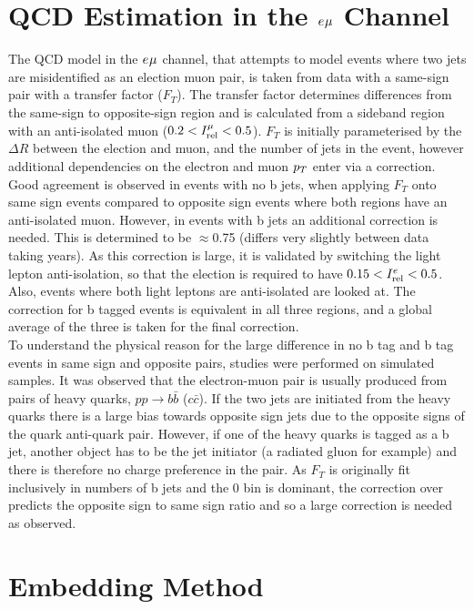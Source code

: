 \section{QCD Estimation in the $e_{}\mu_{}$ Channel}
\label{sec:qcd}

The QCD model in the $e_{}\mu_{}$ channel, that attempts to model events where two jets are misidentified as an election muon pair, is taken from data with a same-sign pair with a transfer factor ($F_{T}$).
The transfer factor determines differences from the same-sign to opposite-sign region and is calculated from a sideband region with an anti-isolated muon ($0.2 < I_{\text{rel}}^{\mu} < 0.5$).
$F_{T}$ is initially parameterised by the $\Delta R$ between the election and muon, and the number of jets in the event, however additional dependencies on the electron and muon $p_{T}$ enter via a correction. \\
Good agreement is observed in events with no b jets, when applying $F_{T}$ onto same sign events compared to opposite sign events where both regions have an anti-isolated muon. 
However, in events with b jets an additional correction is needed.
This is determined to be $\approx$0.75 (differs very slightly between data taking years).
As this correction is large, it is validated by switching the light lepton anti-isolation, so that the election is required to have $0.15 < I_{\text{rel}}^{e} < 0.5$.
Also, events where both light leptons are anti-isolated are looked at.
The correction for b tagged events is equivalent in all three regions, and a global average of the three is taken for the final correction. \\

To understand the physical reason for the large difference in no b tag and b tag events in same sign and opposite pairs, studies were performed on simulated samples.
It was observed that the electron-muon pair is usually produced from pairs of heavy quarks, $pp\rightarrow b\bar{b}$ ($c\bar{c}$).
If the two jets are initiated from the heavy quarks there is a large bias towards opposite sign jets due to the opposite signs of the quark anti-quark pair.
However, if one of the heavy quarks is tagged as a b jet, another object has to be the jet initiator (a radiated gluon for example) and there is therefore no charge preference in the pair.
As $F_{T}$ is originally fit inclusively in numbers of b jets and the 0 bin is dominant, the correction over predicts the opposite sign to same sign ratio and so a large correction is needed as observed.

\section{Embedding Method}
\label{sec:embedding}

